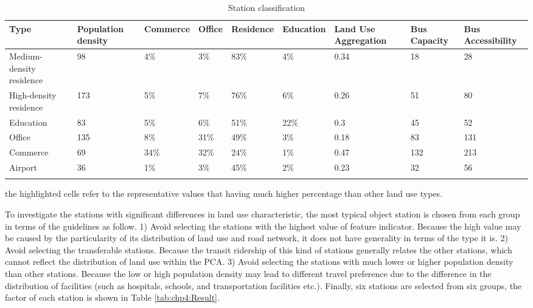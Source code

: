 \begin{sidewaystable}[htbp]
	\centering
	\caption{Station classification}
	\label{tab:chp4:StationClassification}
	\small
	\renewcommand{\arraystretch}{1.25} %
	\begin{tabular}{p{12em}<{\centering}p{4em}<{\centering}p{4em}<{\centering}p{4em}<{\centering}p{4em}<{\centering}p{4em}<{\centering}p{5em}<{\centering}p{5em}<{\centering}p{5em}<{\centering}}
		
		\Xhline{1.5pt}
		Type & Population density & Commerce & Office & Residence & Education & Land Use Aggregation & Bus Capacity & Bus Accessibility \\
		\midrule
		
		Medium-density residence & 98 & 4\% & 3\% & \cellcolor[rgb]{.8, .8, .8} 83\% & 4\% & 0.34 & 18 & 28 \\
		High-density residence & 173 & 5\% & 7\% & \cellcolor[rgb]{.8, .8, .8} 76\% & 6\% & 0.26 & 51 & 80 \\
		Education & 83 & 5\% & 6\% & 51\% & \cellcolor[rgb]{.8, .8, .8} 22\% & 0.3 & 45 & 52 \\
		Office & 135 & 8\% & \cellcolor[rgb]{.8, .8, .8} 31\% & 49\% & 3\% & 0.18 & 83 & 131 \\
		Commerce & 69 & \cellcolor[rgb]{.8, .8, .8} 34\% & \cellcolor[rgb]{.8, .8, .8} 32\% & 24\% & 1\% & 0.47 & 132 & 213 \\
		Airport & 36 & 1\% & 3\% & 45\% & 2\% & 0.23 & 32 & 56 \\
		\Xhline{1.5pt}
		
	\end{tabular}
	\begin{description}
		\normalsize
		\label{note:tab:chp4:StationClassification}
		\item[Note:] the highlighted cells refer to the representative values that having much higher percentage than other land use types.
	\end{description}
	
\end{sidewaystable}

%
To investigate the stations with significant differences in land use characteristic, the most typical object station is chosen from each group in terms of the guidelines as follow. 1) Avoid selecting the stations with the highest value of feature indicator. Because the high value may be caused by the particularity of its distribution of land use and road network, it does not have generality in terms of the type it is. 2) Avoid selecting the transferable stations. Because the transit ridership of this kind of stations generally relates the other stations, which cannot reflect the distribution of land use within the PCA. 3) Avoid selecting the stations with much lower or higher population density than other stations. Because the low or high population density may lead to different travel preference due to the difference in the distribution of facilities (such as hospitals, schools, and transportation facilities etc.). Finally, six stations are selected from six groups, the factor of each station is shown in Table \ref{tab:chp4:Result}.

